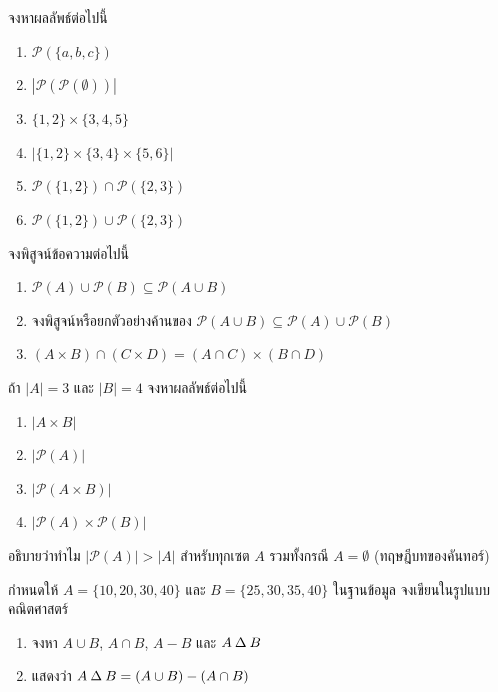 \begin{exercise}
จงหาผลลัพธ์ต่อไปนี้
\begin{enumerate}
    \item $\mathcal{P}(\{a, b, c\})$
    \item $|\mathcal{P}(\mathcal{P}(\emptyset))|$
    \item $\{1, 2\} \times \{3, 4, 5\}$
    \item $|\{1, 2\} \times \{3, 4\} \times \{5, 6\}|$
    \item $\mathcal{P}(\{1, 2\}) \cap \mathcal{P}(\{2, 3\})$
    \item $\mathcal{P}(\{1, 2\}) \cup \mathcal{P}(\{2, 3\})$
\end{enumerate}
\end{exercise}

\begin{exercise}
จงพิสูจน์ข้อความต่อไปนี้
\begin{enumerate}
    \item $\mathcal{P}(A) \cup \mathcal{P}(B) \subseteq \mathcal{P}(A \cup B)$
    \item จงพิสูจน์หรือยกตัวอย่างค้านของ $\mathcal{P}(A \cup B) \subseteq \mathcal{P}(A) \cup \mathcal{P}(B)$
    \item $(A \times B) \cap (C \times D) = (A \cap C) \times (B \cap D)$
\end{enumerate}
\end{exercise}

\begin{exercise}
ถ้า $|A| = 3$ และ $|B| = 4$ จงหาผลลัพธ์ต่อไปนี้
\begin{enumerate}
    \item $|A \times B|$
    \item $|\mathcal{P}(A)|$
    \item $|\mathcal{P}(A \times B)|$
    \item $|\mathcal{P}(A) \times \mathcal{P}(B)|$
\end{enumerate}
\end{exercise}

\begin{exercise}
อธิบายว่าทำไม $|\mathcal{P}(A)| > |A|$ สำหรับทุกเซต $A$ รวมทั้งกรณี $A = \emptyset$ (ทฤษฎีบทของคันทอร์)
\end{exercise}

\begin{exercise}
กำหนดให้ $A = \{10, 20, 30, 40\}$ และ $B = \{25, 30, 35, 40\}$ ในฐานข้อมูล จงเขียนในรูปแบบคณิตศาสตร์
\begin{enumerate}
    \item จงหา $A \cup B$, $A \cap B$, $A - B$ และ $A \mathbin{\Delta} B$
    \item แสดงว่า $A \mathbin{\Delta} B = (A \cup B) - (A \cap B)$
\end{enumerate}
\end{exercise}

